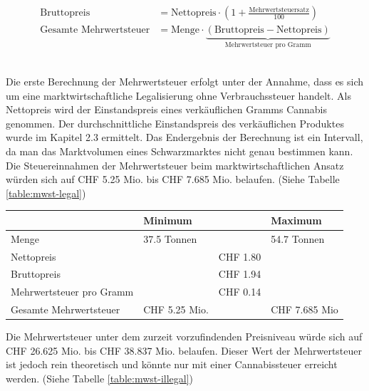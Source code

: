 \documentclass[../main.tex]{subfiles}
\begin{document}
	 \noindent
	 \begin{align}
	 	 \text{Bruttopreis} &= \text{Nettopreis} \cdot \left( 1 + \frac{\text{Mehrwertsteuersatz}}{100} \right)\label{equ:brutto} \\[7pt]
	 	\text{Gesamte Mehrwertsteuer} &= \text{Menge} \cdot \underbrace{\left(\text{Bruttopreis} - \text{Nettopreis} \right)}_{\text{Mehrwertsteuer pro Gramm}} \label{equ:mwst} 
	 \end{align}
	 
	 \noindent\\
	 Die erste Berechnung der Mehrwertsteuer erfolgt unter der Annahme, dass es sich um eine marktwirtschaftliche Legalisierung ohne Verbrauchssteuer handelt.
	 Als Nettopreis wird der Einstandspreis eines verkäuflichen Gramms Cannabis genommen.
	 Der durchschnittliche Einstandspreis des verkäuflichen Produktes wurde im Kapitel 2.3 ermittelt.
	 Das Endergebnis der Berechnung ist ein Intervall, da man das Marktvolumen eines Schwarzmarktes nicht genau bestimmen kann. 
	 Die Steuereinnahmen der Mehrwertsteuer beim marktwirtschaftlichen Ansatz würden sich auf CHF 5.25 Mio. bis CHF 7.685 Mio. belaufen.
	 (Siehe Tabelle \ref{table:mwst-legal})
	 
	 \noindent
	 \captionsetup{font=small}
	 \label{table:mwst-legal}
	 \begin{tabularx}{\textwidth}{X p{3.5cm} p{2.5cm} p{3.5cm}}
     	\toprule
     	\phantom{x} & Minimum & & Maximum \\
        \midrule
        Menge & 37.5 Tonnen & & 54.7 Tonnen\\
        \midrule
        Nettopreis & & CHF 1.80 & \\
        \midrule
        Bruttopreis & & CHF 1.94 & \\
        \midrule
        Mehrwertsteuer pro Gramm & & CHF 0.14 & \\
        \midrule
        Gesamte Mehrwertsteuer & CHF 5.25 Mio. & & CHF 7.685 Mio\\
        \bottomrule
     \end{tabularx}\pagebreak
     
     \noindent
     Die Mehrwertsteuer unter dem zurzeit vorzufindenden Preisniveau würde sich auf CHF 26.625 Mio. bis CHF 38.837 Mio. belaufen.
     Dieser Wert der Mehrwertsteuer ist jedoch rein theoretisch und könnte nur mit einer Cannabissteuer erreicht werden.
	 (Siehe Tabelle \ref{table:mwst-illegal})
     
\end{document}
